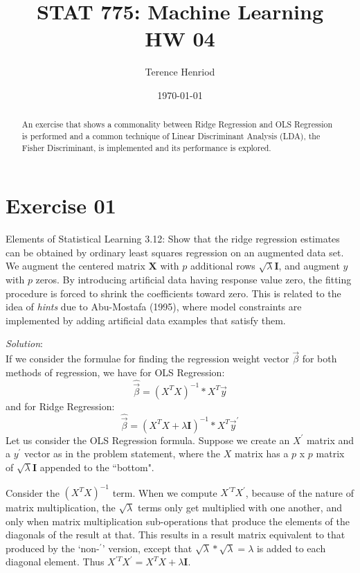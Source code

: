 \documentclass{article}
\title{STAT 775: Machine Learning \\ HW 04}
\author{Terence Henriod}
\date{\today}
\begin{document}
\clearpage            %
\maketitle            %
\thispagestyle{empty} %

\begin{abstract}
An exercise that shows a commonality between Ridge Regression and OLS Regression is performed and a common technique of Linear Discriminant Analysis (LDA), the Fisher Discriminant, is implemented and its performance is explored.
\end{abstract}

\newpage
\section{Exercise 01}
Elements of Statistical Learning 3.12: Show that the ridge regression estimates can be obtained by ordinary least squares regression on an augmented data set. We augment the centered matrix $\textbf{X}$ with $p$ additional rows $\sqrt{\lambda}\textbf{I}$, and augment $y$ with $p$ zeros. By introducing artificial data having response value zero, the fitting procedure is forced to shrink the coefficients toward zero. This is related to the idea of \emph{hints} due to Abu-Mostafa (1995), where model constraints are implemented by adding artificial data examples that satisfy them.

\textit{Solution}:\\
If we consider the formulae for finding the regression weight vector $\vec{\beta}$ for both methods of regression, we have for OLS Regression:
$$\hat{\vec{\beta}} = (X^{T}X)^{-1} * X^{T}\vec{y}$$
and for Ridge Regression:
$$\hat{\vec{\beta}} = (X^{T}X + \lambda\textbf{I})^{-1} * X^{T}\vec{y}^\prime$$
Let us consider the OLS Regression formula. Suppose we create an $X^\prime$ matrix and a $y^\prime$ vector as in the problem statement, where the $X$ matrix has a $p$ x $p$ matrix of $\sqrt{\lambda}\textbf{I}$ appended to the ``bottom".

Consider the $(X^{T}X)^{-1}$ term. When we compute $X^{\prime T}X^\prime$, because of the nature of matrix multiplication, the $\sqrt{\lambda}$ terms only get multiplied with one another, and only when matrix multiplication sub-operations that produce the elements of the diagonals of the result at that. This results in a result matrix equivalent to that produced by the `non-$^\prime$' version, except that $\sqrt{\lambda} * \sqrt{\lambda} = \lambda$ is added to each diagonal element. Thus $X^{\prime T}X^\prime = X^{T}X + \lambda\textbf{I}$.
\end{document}
